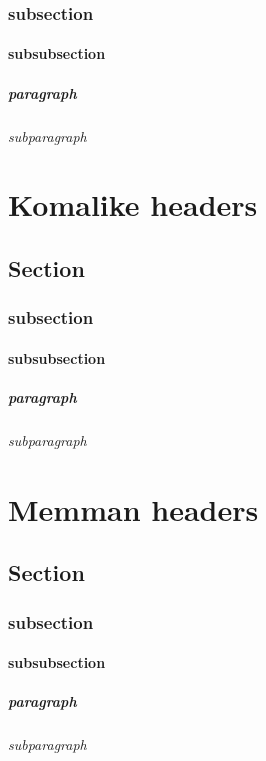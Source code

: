 \documentclass[a4paper, 12pt]{memoir}
\begin{document}
\subsection*{subsection }
\subsubsection*{subsubsection} 
\paragraph*{paragraph} 
\subparagraph*{subparagraph} 

\chapter*{ Komalike headers } 
\section*{ Section }
\subsection*{subsection }
\subsubsection*{subsubsection} 
\paragraph*{paragraph} 
\subparagraph*{subparagraph} 


\chapter*{ Memman headers } 
\section*{ Section }
\subsection*{subsection }
\subsubsection*{subsubsection} 
\paragraph*{paragraph} 
\subparagraph*{subparagraph} 
\end{document}
